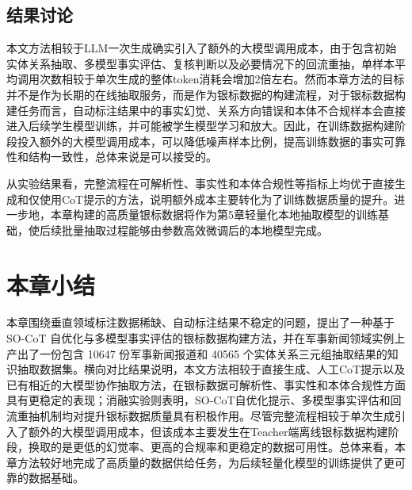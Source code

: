 \subsection{结果讨论}

本文方法相较于LLM一次生成确实引入了额外的大模型调用成本，由于包含初始实体关系抽取、多模型事实评估、复核判断以及必要情况下的回流重抽，单样本平均调用次数相较于单次生成的整体token消耗会增加2倍左右。然而本章方法的目标并不是作为长期的在线抽取服务，而是作为银标数据的构建流程，对于银标数据构建任务而言，自动标注结果中的事实幻觉、关系方向错误和本体不合规样本会直接进入后续学生模型训练，并可能被学生模型学习和放大。因此，在训练数据构建阶段投入额外的大模型调用成本，可以降低噪声样本比例，提高训练数据的事实可靠性和结构一致性，总体来说是可以接受的。

从实验结果看，完整流程在可解析性、事实性和本体合规性等指标上均优于直接生成和仅使用CoT提示的方法，说明额外成本主要转化为了训练数据质量的提升。进一步地，本章构建的高质量银标数据将作为第5章轻量化本地抽取模型的训练基础，使后续批量抽取过程能够由参数高效微调后的本地模型完成。

\section{本章小结}

本章围绕垂直领域标注数据稀缺、自动标注结果不稳定的问题，提出了一种基于 SO-CoT 自优化与多模型事实评估的银标数据构建方法，并在军事新闻领域实例上产出了一份包含 10647 份军事新闻报道和 40565 个实体关系三元组抽取结果的知识抽取数据集。横向对比结果说明，本文方法相较于直接生成、人工CoT提示以及已有相近的大模型协作抽取方法，在银标数据可解析性、事实性和本体合规性方面具有更稳定的表现；消融实验则表明，SO-CoT自优化提示、多模型事实评估和回流重抽机制均对提升银标数据质量具有积极作用。尽管完整流程相较于单次生成引入了额外的大模型调用成本，但该成本主要发生在Teacher端离线银标数据构建阶段，换取的是更低的幻觉率、更高的合规率和更稳定的数据可用性。总体来看，本章方法较好地完成了高质量的数据供给任务，为后续轻量化模型的训练提供了更可靠的数据基础。

